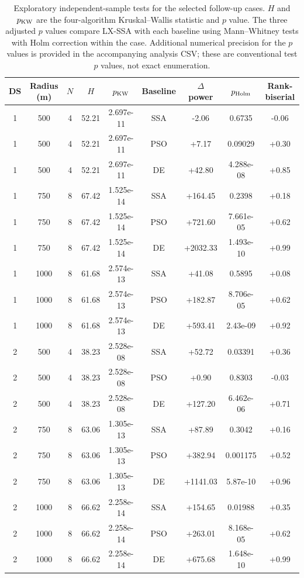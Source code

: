 \begin{table}[!t]
\centering\caption{Exploratory independent-sample tests for the selected follow-up cases. $H$ and $p_{\rm KW}$ are the four-algorithm Kruskal--Wallis statistic and $p$ value. The three adjusted $p$ values compare LX-SSA with each baseline using Mann--Whitney tests with Holm correction within the case. Additional numerical precision for the $p$ values is provided in the accompanying analysis CSV; these are conventional test $p$ values, not exact enumeration.}
\label{tab:exploratory-tests}
\footnotesize\setlength{\tabcolsep}{3pt}
\begin{tabular}{ccccccccc}
\toprule
DS & Radius (m) & $N$ & $H$ & $p_{\rm KW}$ & Baseline & $\Delta$ power & $p_{\rm Holm}$ & Rank-biserial \\
\midrule
1 & 500 & 4 & 52.21 & 2.697e-11 & SSA & -2.06 & 0.6735 & -0.06 \\
1 & 500 & 4 & 52.21 & 2.697e-11 & PSO & +7.17 & 0.09029 & +0.30 \\
1 & 500 & 4 & 52.21 & 2.697e-11 & DE & +42.80 & 4.288e-08 & +0.85 \\
\midrule
1 & 750 & 8 & 67.42 & 1.525e-14 & SSA & +164.45 & 0.2398 & +0.18 \\
1 & 750 & 8 & 67.42 & 1.525e-14 & PSO & +721.60 & 7.661e-05 & +0.62 \\
1 & 750 & 8 & 67.42 & 1.525e-14 & DE & +2032.33 & 1.493e-10 & +0.99 \\
\midrule
1 & 1000 & 8 & 61.68 & 2.574e-13 & SSA & +41.08 & 0.5895 & +0.08 \\
1 & 1000 & 8 & 61.68 & 2.574e-13 & PSO & +182.87 & 8.706e-05 & +0.62 \\
1 & 1000 & 8 & 61.68 & 2.574e-13 & DE & +593.41 & 2.43e-09 & +0.92 \\
\midrule
2 & 500 & 4 & 38.23 & 2.528e-08 & SSA & +52.72 & 0.03391 & +0.36 \\
2 & 500 & 4 & 38.23 & 2.528e-08 & PSO & +0.90 & 0.8303 & -0.03 \\
2 & 500 & 4 & 38.23 & 2.528e-08 & DE & +127.20 & 6.462e-06 & +0.71 \\
\midrule
2 & 750 & 8 & 63.06 & 1.305e-13 & SSA & +87.89 & 0.3042 & +0.16 \\
2 & 750 & 8 & 63.06 & 1.305e-13 & PSO & +382.94 & 0.001175 & +0.52 \\
2 & 750 & 8 & 63.06 & 1.305e-13 & DE & +1141.03 & 5.87e-10 & +0.96 \\
\midrule
2 & 1000 & 8 & 66.62 & 2.258e-14 & SSA & +154.65 & 0.01988 & +0.35 \\
2 & 1000 & 8 & 66.62 & 2.258e-14 & PSO & +263.01 & 8.168e-05 & +0.62 \\
2 & 1000 & 8 & 66.62 & 2.258e-14 & DE & +675.68 & 1.648e-10 & +0.99 \\

\bottomrule
\end{tabular}
\end{table}

